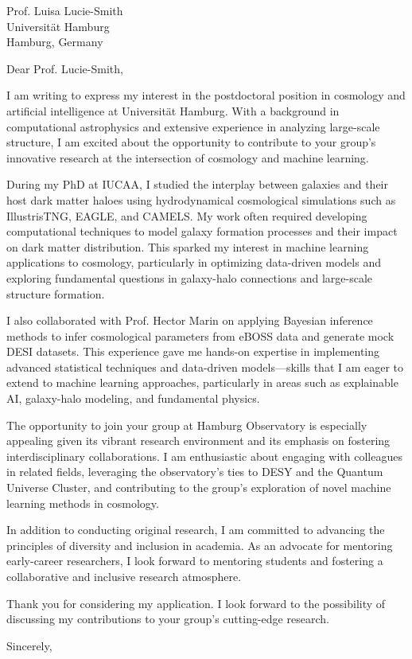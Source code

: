 \documentclass[11pt]{letter}
\begin{document}
\begin{letter}{Prof. Luisa Lucie-Smith \\ Universität Hamburg \\ Hamburg, Germany}

\opening{Dear Prof. Lucie-Smith,}



I am writing to express my interest in the postdoctoral position in cosmology and artificial intelligence at Universität Hamburg. With a background in computational astrophysics and extensive experience in analyzing large-scale structure, I am excited about the opportunity to contribute to your group’s innovative research at the intersection of cosmology and machine learning.

During my PhD at IUCAA, I studied the interplay between galaxies and their host dark matter haloes using hydrodynamical cosmological simulations such as IllustrisTNG, EAGLE, and CAMELS. My work often required developing computational techniques to model galaxy formation processes and their impact on dark matter distribution. This sparked my interest in machine learning applications to cosmology, particularly in optimizing data-driven models and exploring fundamental questions in galaxy-halo connections and large-scale structure formation.

I also collaborated with Prof. Hector Marin on applying Bayesian inference methods to infer cosmological parameters from eBOSS data and generate mock DESI datasets. This experience gave me hands-on expertise in implementing advanced statistical techniques and data-driven models—skills that I am eager to extend to machine learning approaches, particularly in areas such as explainable AI, galaxy-halo modeling, and fundamental physics.

The opportunity to join your group at Hamburg Observatory is especially appealing given its vibrant research environment and its emphasis on fostering interdisciplinary collaborations. I am enthusiastic about engaging with colleagues in related fields, leveraging the observatory's ties to DESY and the Quantum Universe Cluster, and contributing to the group’s exploration of novel machine learning methods in cosmology.

In addition to conducting original research, I am committed to advancing the principles of diversity and inclusion in academia. As an advocate for mentoring early-career researchers, I look forward to mentoring students and fostering a collaborative and inclusive research atmosphere.

Thank you for considering my application. I look forward to the possibility of discussing my contributions to your group’s cutting-edge research. 

\closing{Sincerely,}

\end{letter}
\end{document}
